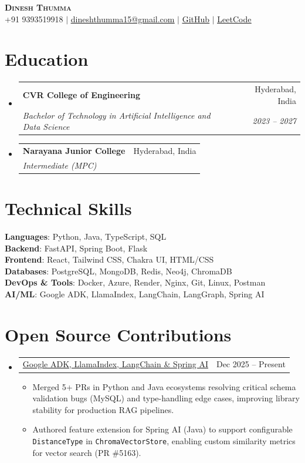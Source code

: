 \documentclass[letterpaper,11pt]{article}
\makeatletter
\newcommand{\resumeItem}[1]{
  \item\small{{#1 \vspace{-2pt}}}
}
\newcommand{\resumeSubheading}[4]{
  \vspace{-2pt}\item
  \begin{tabular*}{0.97\textwidth}[t]{l@{\extracolsep{\fill}}r}
    \textbf{#1} & #2 \\
    \textit{\small#3} & \textit{\small #4} \\
  \end{tabular*}\vspace{-7pt}
}
\newcommand{\resumeProjectHeading}[2]{
  \item
  \begin{tabular*}{0.97\textwidth}{l@{\extracolsep{\fill}}r}
    \small#1 & #2 \\
  \end{tabular*}\vspace{-7pt}
}
\newcommand{\resumeSubHeadingListStart}{\begin{itemize}[leftmargin=0.15in, label={}]}
\newcommand{\resumeSubHeadingListEnd}{\end{itemize}}
\newcommand{\resumeItemListStart}{\begin{itemize}}
\newcommand{\resumeItemListEnd}{\end{itemize}\vspace{-5pt}}
\makeatother
\begin{document}
\begin{center}
  \textbf{\Huge \scshape Dinesh Thumma} \\ \vspace{1pt}
  \small +91 9393519918 $|$
  \href{mailto:dineshthumma15@gmail.com}{\underline{dineshthumma15@gmail.com}} $|$
  \href{https://github.com/DineshThumma9}{\underline{GitHub}} $|$
  \href{https://leetcode.com/u/dineshthummax975/}{\underline{LeetCode}}
\end{center}


\section{Education}
  \resumeSubHeadingListStart
    \resumeSubheading
      {CVR College of Engineering}{Hyderabad, India}
      {Bachelor of Technology in Artificial Intelligence and Data Science}{2023 -- 2027}
    \resumeSubheading
      {Narayana Junior College}{Hyderabad, India}
      {Intermediate (MPC)}{}
  \resumeSubHeadingListEnd

\section{Technical Skills}
 \begin{itemize}[leftmargin=0.15in, label={}]
    \small{\item{
     \textbf{Languages}{: Python, Java, TypeScript, SQL} \\
     \textbf{Backend}{: FastAPI, Spring Boot, Flask} \\
     \textbf{Frontend}{: React, Tailwind CSS, Chakra UI, HTML/CSS} \\
     \textbf{Databases}{: PostgreSQL, MongoDB, Redis, Neo4j, ChromaDB} \\
     \textbf{DevOps \& Tools}{: Docker, Azure, Render, Nginx, Git, Linux, Postman} \\
     \textbf{AI/ML}{: Google ADK, LlamaIndex, LangChain, LangGraph, Spring AI}
    }}
 \end{itemize}

\section{Open Source Contributions}
\resumeSubHeadingListStart
  \resumeProjectHeading
      {\href{https://github.com/pulls?q=is\%3Apr+author\%3ADineshThumma9}{Google ADK, LlamaIndex, LangChain \& Spring AI}}{Dec 2025 -- Present}
      \resumeItemListStart
        \resumeItem{Merged 5+ PRs in Python and Java ecosystems resolving critical schema validation bugs (MySQL) and type-handling edge cases, improving library stability for production RAG pipelines.}
        \resumeItem{Authored feature extension for Spring AI (Java) to support configurable \texttt{DistanceType} in \texttt{ChromaVectorStore}, enabling custom similarity metrics for vector search (PR \#5163).}
      \resumeItemListEnd
\resumeSubHeadingListEnd
\end{document}

